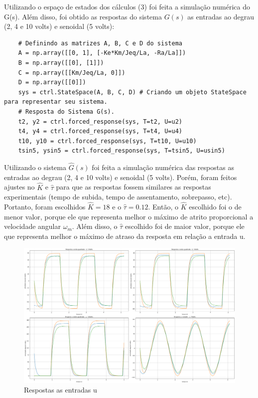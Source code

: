 \documentclass[10pt]{article}
\begin{document}
\quad Utilizando o espaço de estados dos cálculos (3) foi feita a simulação numérica do G(s).
Além disso, foi obtido as respostas do sistema $G(s)$ as entradas ao degrau (2, 4 e 10 volts) e
senoidal (5 volts):

\begin{verbatim}
    # Definindo as matrizes A, B, C e D do sistema
    A = np.array([[0, 1], [-Ke*Km/Jeq/La, -Ra/La]])
    B = np.array([[0], [1]])
    C = np.array([[Km/Jeq/La, 0]])
    D = np.array([[0]])
    sys = ctrl.StateSpace(A, B, C, D) # Criando um objeto StateSpace para representar seu sistema.
    # Resposta do Sistema G(s).
    t2, y2 = ctrl.forced_response(sys, T=t2, U=u2)
    t4, y4 = ctrl.forced_response(sys, T=t4, U=u4)
    t10, y10 = ctrl.forced_response(sys, T=t10, U=u10)
    tsin5, ysin5 = ctrl.forced_response(sys, T=tsin5, U=usin5)
\end{verbatim}

\quad Utilizando o sistema $\hat{G}(s)$ foi feita a simulação numérica das respostas
as entradas ao degrau (2, 4 e 10 volts) e senoidal (5 volts).
Porém, foram feitos ajustes no $\hat{K}$ e $\hat{\tau}$ para que as respostas fossem similares as respostas experimentais (tempo de
subida, tempo de assentamento, sobrepasso, etc). Portanto, foram escolhidos $\hat{K} = 18$ e o $\hat{\tau} = 0.12$.
Então, o $\hat{K}$ escolhido foi o de menor valor, porque ele que representa melhor o máximo de atrito proporcional a velocidade angular $\omega_m$.
Além disso, o $\hat{\tau}$ escolhido foi de maior valor, porque ele que representa melhor o máximo de atraso da resposta em relação a entrada u.

\begin{figure}[h]
    \centering
    \includegraphics[scale=0.3]{respostas.png}
    \caption{Respostas as entradas u}
\end{figure}
\end{document}
